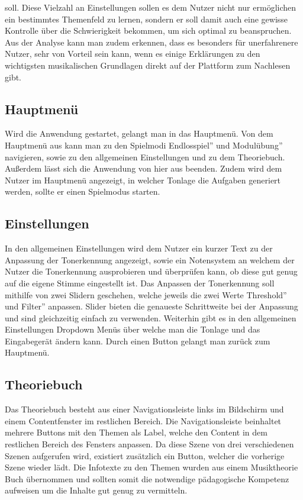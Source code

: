 soll. Diese Vielzahl an Einstellungen sollen es dem Nutzer nicht nur ermöglichen ein bestimmtes Themenfeld zu lernen, sondern er soll damit auch eine gewisse Kontrolle über die Schwierigkeit bekommen, um sich optimal zu beanspruchen. Aus der Analyse kann man zudem erkennen, dass es besonders für unerfahrenere Nutzer, sehr von Vorteil sein kann, wenn es einige Erklärungen zu den wichtigsten musikalischen Grundlagen direkt auf der Plattform zum Nachlesen gibt. 

\subsection{Hauptmenü}
Wird die Anwendung gestartet, gelangt man in das Hauptmenü. Von dem Hauptmenü aus kann man zu den Spielmodi \glqq Endlosspiel'' und \glqq Modulübung'' navigieren, sowie zu den allgemeinen Einstellungen und zu dem Theoriebuch. Außerdem lässt sich die Anwendung von hier aus beenden. Zudem wird dem Nutzer im Hauptmenü angezeigt, in welcher Tonlage die Aufgaben generiert werden, sollte er einen Spielmodus starten.

\subsection{Einstellungen}
In den allgemeinen Einstellungen wird dem Nutzer ein kurzer Text zu der Anpassung der Tonerkennung angezeigt, sowie ein Notensystem an welchem der Nutzer die Tonerkennung ausprobieren und überprüfen kann, ob diese gut genug auf die eigene Stimme eingestellt ist. Das Anpassen der Tonerkennung soll mithilfe von zwei Slidern geschehen, welche jeweils die zwei Werte \glqq Threshold'' und \glqq Filter'' anpassen. Slider bieten die genaueste Schrittweite bei der Anpassung und sind gleichzeitig einfach zu verwenden. Weiterhin gibt es in den allgemeinen Einstellungen Dropdown Menüs über welche man die Tonlage und das Eingabegerät ändern kann. Durch einen Button gelangt man zurück zum Hauptmenü.

\subsection{Theoriebuch}
Das Theoriebuch besteht aus einer Navigationsleiste links im Bildschirm und einem Contentfenster im restlichen Bereich. Die Navigationsleiste beinhaltet mehrere Buttons mit den Themen als Label, welche den Content in dem restlichen Bereich des Fensters anpassen. Da diese Szene von drei verschiedenen Szenen aufgerufen wird, existiert zusätzlich ein Button, welcher die vorherige Szene wieder lädt. Die Infotexte zu den Themen wurden aus einem Musiktheorie Buch übernommen und sollten somit die notwendige pädagogische Kompetenz aufweisen um die Inhalte gut genug zu vermitteln. \cite{abcmusik} 

